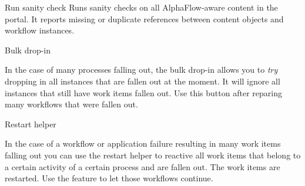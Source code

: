 \begin{memberdesc}{Run sanity check}
Runs sanity checks on all AlphaFlow-aware content in the
portal. It reports missing or duplicate references between content objects and
workflow instances.
\end{memberdesc}

\begin{memberdesc}{Bulk drop-in}

In the case of many processes falling out, the bulk drop-in allows you to
\emph{try} dropping in all instances that are fallen out at the moment. It will
ignore all instances that still have work items fallen out. Use this button
after reparing many workflows that were fallen out.

\end{memberdesc}

\begin{memberdesc}{Restart helper}

In the case of a workflow or application failure resulting in many work items
falling out you can use the restart helper to reactive all work items that
belong to a certain activity of a certain process and are fallen out. The work
items are restarted. Use the  feature to let those
workflows continue.

\end{memberdesc}
